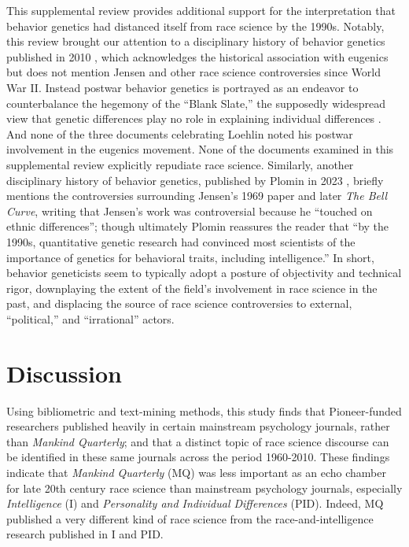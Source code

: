 \documentclass[12pt]{article}
\begin{document}
This supplemental review provides additional support for the interpretation that behavior genetics had distanced itself from race science by the 1990s. Notably, this review brought our attention to a disciplinary history of behavior genetics published in 2010 \cite{McGueEndBehavioralGenetics2010}, which acknowledges the historical association with eugenics but does not mention Jensen and other race science controversies since World War II. Instead postwar behavior genetics is portrayed as an endeavor to counterbalance the hegemony of the ``Blank Slate,'' the supposedly widespread view that genetic differences play no role in explaining individual differences \cite{BatesonCorpseWearisomeDebate2002}. And none of the three documents celebrating Loehlin noted his postwar involvement in the eugenics movement. None of the documents examined in this supplemental review explicitly repudiate race science. Similarly, another disciplinary history of behavior genetics, published by Plomin in 2023 \cite{PlominCelebratingCenturyResearch2023}, briefly mentions the controversies surrounding Jensen's 1969 paper and later \emph{The Bell Curve}, writing that Jensen's work was controversial because he ``touched on ethnic differences''; though ultimately Plomin reassures the reader that ``by the 1990s, quantitative genetic research had convinced most scientists of the importance of genetics for behavioral traits, including intelligence.'' In short, behavior geneticists seem to typically adopt a posture of objectivity and technical rigor, downplaying the extent of the field's involvement in race science in the past, and displacing the source of race science controversies to external, ``political,'' and ``irrational'' actors.

\hypertarget{discussion}{%
\section*{Discussion}\label{discussion}}

Using bibliometric and text-mining methods, this study finds that Pioneer-funded researchers published heavily in certain mainstream psychology journals, rather than \emph{Mankind Quarterly}; and that a distinct topic of race science discourse can be identified in these same journals across the period 1960-2010. These findings indicate that \emph{Mankind Quarterly} (MQ) was less important as an echo chamber for late 20th century race science than mainstream psychology journals, especially \emph{Intelligence} (I) and \emph{Personality and Individual Differences} (PID). Indeed, MQ published a very different kind of race science from the race-and-intelligence research published in I and PID.
\end{document}
